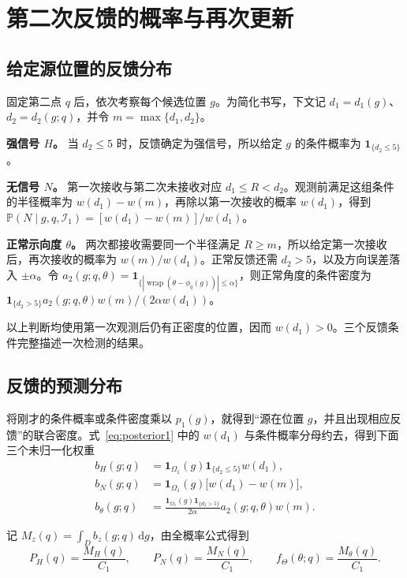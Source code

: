 \documentclass[UTF8,a4paper,zihao=-4,fontset=none]{ctexart}
\numberwithin{equation}{section}
\newcommand{\ind}{\mathbf 1}
\newcommand{\dd}{\,\mathrm d}
\newcommand{\Prob}{\mathbb P}
\newcommand{\wrap}{\operatorname{wrap}}
\begin{document}
\section{第二次反馈的概率与再次更新}
\subsection{给定源位置的反馈分布}
固定第二点 \(q\) 后，依次考察每个候选位置 \(g\)。为简化书写，下文记 \(d_1=d_1(g)\)、\(d_2=d_2(g;q)\)，并令 \(m=\max\{d_1,d_2\}\)。

\textbf{强信号 \(H\)。} 当 \(d_2\le5\) 时，反馈确定为强信号，所以给定 \(g\) 的条件概率为 \(\ind_{\{d_2\le5\}}\)。

\textbf{无信号 \(N\)。} 第一次接收与第二次未接收对应 \(d_1\le R<d_2\)。观测前满足这组条件的半径概率为 \(w(d_1)-w(m)\)，再除以第一次接收的概率 \(w(d_1)\)，得到 \(\Prob(N\mid g,q,\mathcal I_1)=[w(d_1)-w(m)]/w(d_1)\)。

\textbf{正常示向度 \(\theta\)。} 两次都接收需要同一个半径满足 \(R\ge m\)，所以给定第一次接收后，再次接收的概率为 \(w(m)/w(d_1)\)。正常反馈还需 \(d_2>5\)，以及方向误差落入 \(\pm\alpha\)。令 \(a_2(g;q,\theta)=\ind_{\{|\wrap(\theta-\phi_q(g))|\le\alpha\}}\)，则正常角度的条件密度为 \(\ind_{\{d_2>5\}}a_2(g;q,\theta)w(m)/(2\alpha w(d_1))\)。

以上判断均使用第一次观测后仍有正密度的位置，因而 \(w(d_1)>0\)。三个反馈条件完整描述一次检测的结果。

\subsection{反馈的预测分布}
将刚才的条件概率或条件密度乘以 \(p_1(g)\)，就得到“源在位置 \(g\)，并且出现相应反馈”的联合密度。式~\eqref{eq:posterior1} 中的 \(w(d_1)\) 与条件概率分母约去，得到下面三个未归一化权重
\begin{equation}\label{eq:weights}
\begin{aligned}
b_H(g;q)&=\ind_{\Omega_1}(g)\ind_{\{d_2\le5\}}w(d_1),\\
b_N(g;q)&=\ind_{\Omega_1}(g)\bigl[w(d_1)-w(m)\bigr],\\
b_\theta(g;q)&=\frac{\ind_{\Omega_1}(g)\ind_{\{d_2>5\}}}{2\alpha}
 a_2(g;q,\theta)w(m).
\end{aligned}
\end{equation}

记 \(M_z(q)=\int_D b_z(g;q)\dd g\)，由全概率公式得到
\begin{equation}\label{eq:feedbackprob}
P_H(q)=\frac{M_H(q)}{C_1},\qquad
P_N(q)=\frac{M_N(q)}{C_1},\qquad
f_\Theta(\theta;q)=\frac{M_\theta(q)}{C_1}.
\end{equation}
\end{document}
